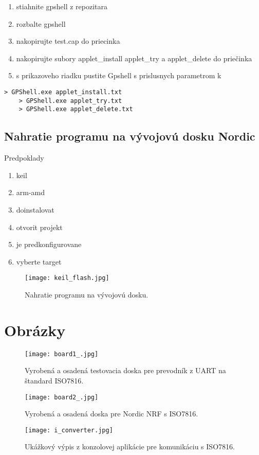 \documentclass[12pt,a4wide,oneside,openright]{report}
\renewcommand\lstlistingname{Ukážka kódu}
\begin{document}
	\begin{enumerate}
		\item stiahnite gpshell z repozitara 
		\item rozbalte gpshell
		\item nakopirujte test.cap do priecinka
		\item nakopirujte subory applet\_install applet\_try a applet\_delete do priečinka
		\item s prikazoveho riadku pustite Gpshell s prislusnych parametrom k 
	\end{enumerate}

\renewcommand\lstlistingname{}
	\begin{lstlisting}[caption={Nahratie appletu cez nástroj GPShell.} label={lst:gpshell}] 
	> GPShell.exe applet_install.txt
	> GPShell.exe applet_try.txt
	> GPShell.exe applet_delete.txt
	\end{lstlisting}


\section{Nahratie programu na vývojovú dosku Nordic} \label{s_nrf_program}
	
	Predpoklady
	\begin{enumerate}
		\item keil
		\item arm-amd
		\item doinstalovat 
		\item otvorit projekt
		\item je predkonfigurovane
		\item vyberte target	
	\end{enumerate}
	
	\begin{figure*}[h]
		\centering
		\texttt{[image: keil\_flash.jpg]}
		\caption{Nahratie programu na vývojovú dosku.}
		\label{f:i_keil_flash}
	\end{figure*}


\chapter{Obrázky} \label{s_pictures}
\begin{figure*}[h]
	\centering
	\texttt{[image: board1\_.jpg]}
	\caption{Vyrobená a osadená testovacia doska pre prevodník z UART na štandard ISO7816.}
	\label{f:i_board_iso}
\end{figure*}

\begin{figure*}[h]
	\centering
	\texttt{[image: board2\_.jpg]}
	\caption{Vyrobená a osadená doska pre Nordic NRF s ISO7816.}
	\label{f:i_board_nrf}
\end{figure*}

\begin{figure*}[h]
	\centering
	\texttt{[image: i\_converter.jpg]}
	\caption{Ukážkový výpis z konzolovej aplikácie pre komunikáciu s ISO7816.}
	\label{f:i_iso_dekoder}
\end{figure*}
\end{document}
